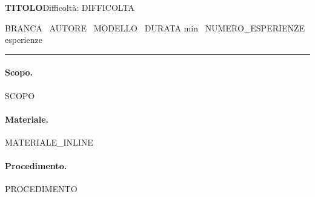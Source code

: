 \documentclass[10pt,a4paper]{article}
\begin{document}
\small

{\large\bfseries {{TITOLO}}}\hfill{\small Difficoltà: {{DIFFICOLTA}}}\par
{\footnotesize
  {{BRANCA}} \textperiodcentered\ {{AUTORE}} \textperiodcentered\ {{MODELLO}}
  \textperiodcentered\ {{DURATA}} min
  \textperiodcentered\ {{NUMERO_ESPERIENZE}} esperienze\par
}
\vspace{2pt}\hrule\vspace{4pt}

\paragraph{Scopo.} {{SCOPO}}

\paragraph{Materiale.} {{MATERIALE_INLINE}}

\paragraph{Procedimento.} {{PROCEDIMENTO}}
\end{document}
